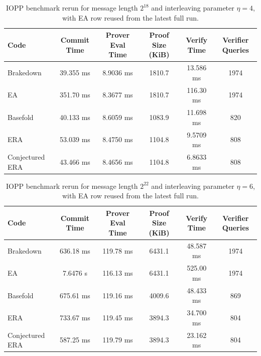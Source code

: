 \begin{table}[htbp]
\centering
\begin{tabular}{lccccc}
\hline
Code & Commit Time & Prover Eval Time & Proof Size (KiB) & Verify Time & Verifier Queries \\
\hline
Brakedown & 39.355 ms & 8.9036 ms & 1810.7 & 13.586 ms & 1974 \\
EA & 351.70 ms & 8.3677 ms & 1810.7 & 116.30 ms & 1974 \\
Basefold & 40.133 ms & 8.6059 ms & 1083.9 & 11.698 ms & 820 \\
ERA & 53.039 ms & 8.4750 ms & 1104.8 & 9.5709 ms & 808 \\
Conjectured ERA & 43.466 ms & 8.4656 ms & 1104.8 & 6.8633 ms & 808 \\
\hline
\end{tabular}
\caption{IOPP benchmark rerun for message length $2^{18}$ and interleaving parameter $\eta=4$, with EA row reused from the latest full run.}
\label{tab:iopp-noea-joined-218-eta4}
\end{table}

\begin{table}[htbp]
\centering
\begin{tabular}{lccccc}
\hline
Code & Commit Time & Prover Eval Time & Proof Size (KiB) & Verify Time & Verifier Queries \\
\hline
Brakedown & 636.18 ms & 119.78 ms & 6431.1 & 48.587 ms & 1974 \\
EA & 7.6476 s & 116.13 ms & 6431.1 & 525.00 ms & 1974 \\
Basefold & 675.61 ms & 119.16 ms & 4009.6 & 48.433 ms & 869 \\
ERA & 733.67 ms & 119.45 ms & 3894.3 & 34.700 ms & 804 \\
Conjectured ERA & 587.25 ms & 119.79 ms & 3894.3 & 23.162 ms & 804 \\
\hline
\end{tabular}
\caption{IOPP benchmark rerun for message length $2^{22}$ and interleaving parameter $\eta=6$, with EA row reused from the latest full run.}
\label{tab:iopp-noea-joined-222-eta6}
\end{table}

